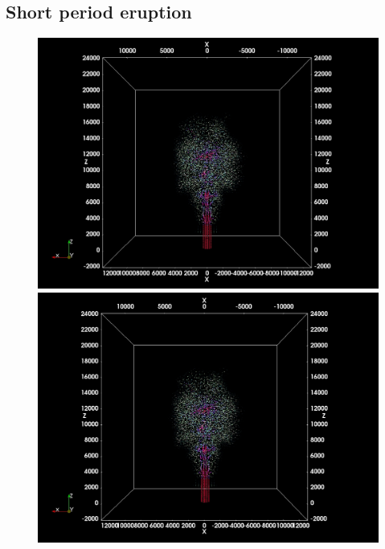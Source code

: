 \subsection{Short period eruption}
\begin{figure}
    \centering
    \begin{minipage}{.33\textwidth}
        \centering
        \includegraphics[width=0.99 \textwidth]{Chapter-6/Figures/ShortErupt/Erupt100_t100}
    \end{minipage}%
    \begin{minipage}{.33 \textwidth}
        \centering
        \includegraphics[width=0.99 \textwidth]{Chapter-6/Figures/ShortErupt/Erupt300_t100}
    \end{minipage}%
    \\

\end{figure}
